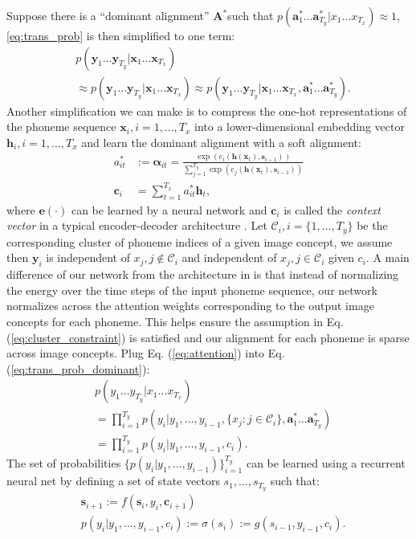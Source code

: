 \documentclass[a4paper]{article}
\begin{document}
Suppose there is a ``dominant alignment'' $\mathbf{A}^*$such that $p(\mathbf{a}_1^*\ldots\mathbf{a}_{T_y}^*|x_1\ldots x_{T_x})\approx 1$, \ref{eq:trans_prob} is then simplified to one term:
\begin{align}\label{eq:trans_prob_dominant}
     &p(\mathbf{y}_1\ldots \mathbf{y}_{T_y}|\mathbf{x}_1\ldots\mathbf{x}_{T_x})\\
     &\approx p(\mathbf{y}_1\ldots \mathbf{y}_{T_y}|\mathbf{x}_1\ldots\mathbf{x}_{T_x}) \approx p(\mathbf{y}_1\ldots \mathbf{y}_{T_y}|\mathbf{x}_1\ldots\mathbf{x}_{T_x}, \mathbf{a}^*_1\ldots\mathbf{a}^*_{T_y}).
\end{align}
Another simplification we can make is to compress the one-hot representations of the phoneme sequence $\mathbf{x}_i, i=1,...,T_x$ into a lower-dimensional embedding vector $\mathbf{h}_i, i=1,...,T_x$ and learn the dominant alignment with a soft alignment:
\begin{align}\label{eq:attention}
    a^*_{it} &:= \mathbf\alpha_{it} =  \frac{\exp(e_i(\mathbf h(\mathbf x_t), \mathbf s_{i-1}))}{\sum_{j=1}^{T_y} \exp(e_j(\mathbf h(\mathbf{x}_t), \mathbf s_{i-1}))}\\
    \mathbf{c}_i &= \sum_{t=1}^{T_x} a^*_{it} \mathbf{h}_{t},
\end{align}
where $\mathbf e(\cdot)$ can be learned by a neural network and $\mathbf{c}_i$ is called the \textit{context vector} in a typical encoder-decoder architecture \cite{Bauhdanau14}.
Let $\mathcal C_i, i=\{1,...,T_y\}$ be the corresponding cluster of phoneme indices of a given image concept, we assume then $\mathbf{y}_i$ is independent of $x_j, j\not\in \mathcal C_i$ and independent of $x_j, j\in \mathcal C_i$ given $c_i$. A main difference of
our network from the architecture in \cite{Bahdanau14} is that instead of normalizing the energy over the time steps of the input phoneme sequence, our network normalizes across the attention weights corresponding to the output image concepts for each phoneme. This helps ensure the assumption in Eq. (\ref{eq:cluster_constraint}) is satisfied and our alignment for each phoneme is sparse across image concepts.
Plug Eq. (\ref{eq:attention}) into Eq. (\ref{eq:trans_prob_dominant}):
\begin{align}
    &p(y_1\ldots y_{T_y}|x_1\ldots x_{T_x})\\
    &= \prod_{i=1}^{T_y} p(y_i|y_1,\ldots, y_{i-1}, \{x_j:j \in \mathcal C_i\}, \mathbf{a}^*_1 \ldots\mathbf{a}^*_{T_y})\\
    &= \prod_{i=1}^{T_y} p(y_i|y_1,\ldots,y_{i-1}, c_i).
\end{align}
The set of probabilities $\{p(y_i|y_1,\ldots,y_{i-1})\}_{i=1}^{T_y}$ can be learned using a recurrent neural net by defining a set of state vectors $s_1,\ldots,s_{T_y}$ such that:
\begin{align}
    &\mathbf{s}_{i+1} := f(\mathbf{s}_i, y_i, \mathbf{c}_{i+1})\\
    &p(y_i|y_1,\ldots,y_{i-1}, c_i) := \sigma(s_i) :=  g(s_{i-1}, y_{i-1}, c_i).
\end{align}
\end{document}
